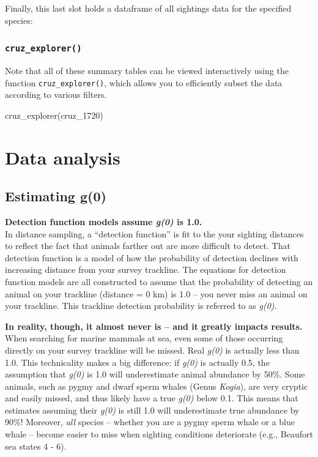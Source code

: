 \documentclass[
]{book}
\newenvironment{Shaded}{\begin{snugshade}}{\end{snugshade}}
\newcommand{\FunctionTok}[1]{\textcolor[rgb]{0.00,0.00,0.00}{#1}}
\newcommand{\NormalTok}[1]{#1}
\begin{document}
Finally, this last slot holds a dataframe of all sightings data for the specified species:

\hypertarget{cruz_explorer}{%
\section*{\texorpdfstring{\texttt{cruz\_explorer()}}{cruz\_explorer()}}\label{cruz_explorer}}

Note that all of these summary tables can be viewed interactively using the function \texttt{cruz\_explorer()},
which allows you to efficiently subset the data according to various filters.

\begin{Shaded}
\begin{Highlighting}[]
\FunctionTok{cruz\_explorer}\NormalTok{(cruz\_1720)}
\end{Highlighting}
\end{Shaded}

\hypertarget{part-data-analysis}{%
\part{Data analysis}\label{part-data-analysis}}

\hypertarget{g0}{%
\chapter{Estimating g(0)}\label{g0}}

\textbf{Detection function models assume \emph{g(0)} is 1.0.}\\
In distance sampling, a ``detection function'' is fit to the your sighting distances to reflect the fact that animals farther out are more difficult to detect. That detection function is a model of how the probability of detection declines with increasing distance from your survey trackline. The equations for detection function models are all constructed to assume that the probability of detecting an animal on your trackline (distance = 0 km) is 1.0 -- you never miss an animal on your trackline. This trackline detection probability is referred to as \emph{g(0)}.

\textbf{In reality, though, it almost never is -- and it greatly impacts results.}\\
When searching for marine mammals at sea, even some of those occurring directly on your survey trackline will be missed. Real \emph{g(0)} is actually less than 1.0. This technicality makes a big difference: if \emph{g(0)} is actually 0.5, the assumption that \emph{g(0)} is 1.0 will underestimate animal abundance by 50\%. Some animals, such as pygmy and dwarf sperm whales (Genus \emph{Kogia}), are very cryptic and easily missed, and thus likely have a true \emph{g(0)} below 0.1. This means that estimates assuming their \emph{g(0)} is still 1.0 will underestimate true abundance by 90\%! Moreover, \emph{all} species -- whether you are a pygmy sperm whale or a blue whale -- become easier to miss when sighting conditions deteriorate (e.g., Beaufort sea states 4 - 6).
\end{document}
